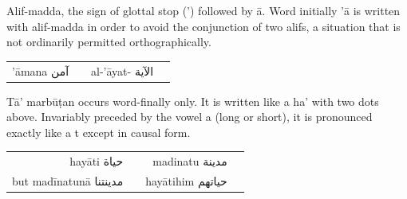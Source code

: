 \documentclass{article}
\newcommand{\ar}[1]{{\arabicfont #1}}
\begin{document}
Alif-madda, the sign of glottal stop (') followed by \={a}. Word initially '\={a} is
written with alif-madda in order to avoid the conjunction of two alifs, a
situation that is not ordinarily permitted orthographically.

\vspace{1em}

\begin{center}
\begin{tabular}{r l r l}
'\={a}mana \ar{آمن} & & al-'\={a}yat- \ar{الآية} \\[6pt]
\end{tabular}
\end{center}

\vspace{1.5em}

T\={a}' marb\={u}\d{t}an occurs word-finally only. It is written like a ha' with two
dots above. Invariably preceded by the vowel a (long or short), it is
pronounced exactly like a t except in causal form.

\vspace{1em}

\begin{center}
\begin{tabular}{r l r l}
hay\={a}ti \ar{حياة} & & madinatu \ar{مدينة} \\[6pt]
but \quad mad\={i}natun\={a} \ar{مدينتنا} & & hay\={a}tihim \ar{حياتهم} \\[6pt]
\end{tabular}
\end{center}
\end{document}
